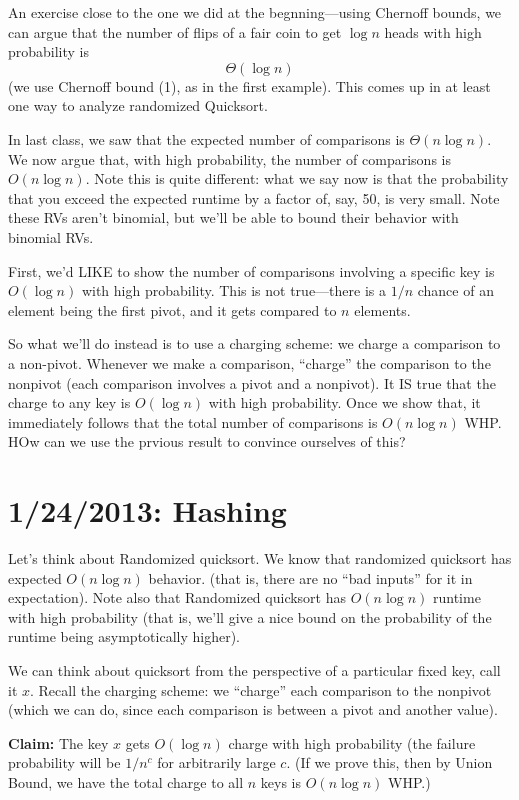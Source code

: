 \documentclass{article}
\begin{document}
An exercise close to the one we did at the begnning---using Chernoff bounds,
we can argue that the number of flips of a fair coin to get $\log n$ heads
with high probability is
$$
\Theta(\log n)
$$
(we use Chernoff bound (1), as in the first example).
This comes up in at least one way to analyze randomized Quicksort.

In last class, we saw that the expected number of comparisons is $\Theta(n\log n)$.
We now argue that, with high probability, the number of comparisons is $O(n\log n)$.
Note this is quite different: what we say now is that the probability that you 
exceed the expected runtime by a factor of, say, 50, is very small.
Note these RVs aren't binomial, but we'll be able to bound their behavior
with binomial RVs.

First, we'd LIKE to show the number of comparisons involving a specific key is $O(\log n)$ with 
high probability.
This is not true---there is a $1/n$ chance of an element being the first
pivot, and it gets compared to $n$ elements.

So what we'll do instead is to use a charging scheme: we charge
a comparison to a non-pivot.
Whenever we make a comparison, ``charge'' the comparison to the nonpivot (each comparison involves a pivot and a nonpivot).
It IS true that the charge to any key is $O(\log n)$ with high probability.
Once we show that, it immediately follows that the total number of comparisons is $O(n\log n)$ WHP.
HOw can we use the prvious result to convince ourselves of this?



\section{1/24/2013: Hashing}

Let's think about Randomized quicksort.
We know that randomized quicksort has expected $O(n\log n)$ behavior.
(that is, there are no ``bad inputs'' for it in expectation).
Note also that Randomized quicksort has $O(n\log n)$ runtime with high
probability (that is, we'll give a nice bound on the probability of 
the runtime being asymptotically higher).


We can think about quicksort from the perspective of a particular fixed
key, call it $x$.
Recall the charging scheme: we ``charge'' each comparison to the nonpivot 
(which we can do, since each comparison is between a pivot and another value).

\textbf{Claim:}
The key $x$ gets $O(\log n)$ charge with high probability (the failure
probability will be $1/n^c$ for arbitrarily large $c$.
(If we prove this, then by Union Bound, we have the total charge to all
$n$ keys is $O(n\log n)$ WHP.)
\end{document}
